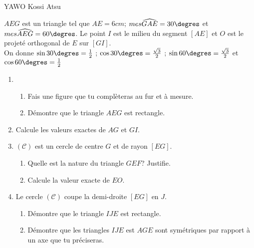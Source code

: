 \documentclass[12pt,a4paper]{book}
\newcommand{\prof}{YAWO Kossi Atsu}
\begin{document}
\newpage
\begin{revision}{\prof}
\begin{exo}
$AEG$ est un triangle tel que $AE=6cm$; $mes\widehat{GAE}=30\degres$ et $mes\widehat{AEG}=60\degres$. Le point $I$ est le milieu du segment $[AE]$ et $O$ est le projeté orthogonal de $E$ sur $[GI]$.\\
On donne $\sin30\degres=\frac{1}{2}$ ; $\cos30\degres=\frac{\sqrt{3}}{2}$ ; $\sin60\degres=\frac{\sqrt{3}}{2}$ et $\cos60\degres=\frac{1}{2}$
\begin{enumerate}
\item \begin{enumerate}
\item Fais une figure que tu complèteras au fur et à mesure.
\item Démontre que le triangle $AEG$ est rectangle.
\end{enumerate}
\item Calcule les valeurs exactes de $AG$ et $GI$.
\item $\mathcal{(C)}$ est un cercle de centre $G$ et de rayon $[EG]$.
\begin{enumerate}
\item Quelle est la nature du triangle $GEF$? Justifie.
\item Calcule la valeur exacte de $EO$.
\end{enumerate}
\item Le cercle $\mathcal{(C)}$ coupe la demi-droite $[EG]$ en $J$.
\begin{enumerate}
\item Démontre que le triangle $IJE$ est rectangle.
\item Démontre que les triangles $IJE$ est $AGE$ sont symétriques par rapport à un axe que tu préciseras.
\end{enumerate}
\end{enumerate}
\end{exo}


\end{revision}
\end{document}

